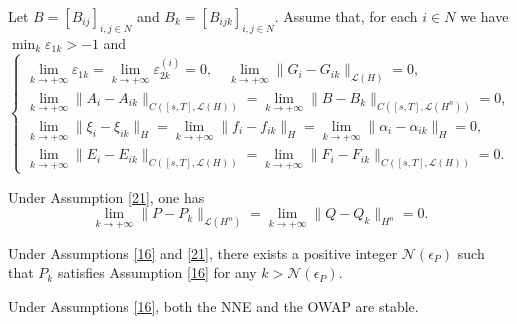 \documentclass[10pt,a4paper]{amsart}
\begin{document}
\begin{assumption}\label{21}
Let $B=[B_{ij}]_{i,j\in N}$ and $B_k=[B_{ijk}]_{i,j\in N}$. Assume that, for each $i\in N$ we have $\min_{k}\varepsilon_{1k}>-1$ and
\begin{equation*}
  \begin{cases}
  \lim_{k\rightarrow+\infty}\varepsilon_{1k}=\lim_{k\rightarrow+\infty}\varepsilon_{2k}^{(i)}=0,\quad\lim_{k\rightarrow+\infty}\|G_i-G_{ik}\|_{\mathcal{L}(H)}=0,\\
    \lim_{k\rightarrow+\infty}\|A_i-A_{ik}\|_{ C([s,T],\mathcal{L}(H))}=\lim_{k\rightarrow+\infty}\|B-B_{k}\|_{ C([s,T],\mathcal{L}(H^n))}=0, \\
  \lim_{k\rightarrow+\infty}\|\xi_i-\xi_{ik}\|_H=\lim_{k\rightarrow+\infty}\|f_i-f_{ik}\|_{H}=\lim_{k\rightarrow+\infty}\|\alpha_i-\alpha_{ik}\|_{H}=0, \\
  \lim_{k\rightarrow+\infty}\|E_i-E_{ik}\|_{ C([s,T],\mathcal{L}(H))}=\lim_{k\rightarrow+\infty}\|F_i-F_{ik}\|_{ C([s,T],\mathcal{L}(H))}=0.
  \end{cases}
\end{equation*}
\end{assumption}

\begin{lemma}\label{33}
Under Assumption \ref{21}, one has $$\lim_{k\rightarrow+\infty}\|P-P_k\|_{\mathcal{L}(H^n)}=\lim_{k\rightarrow+\infty}\|Q-Q_k\|_{H^n}=0.$$
\end{lemma}

\begin{cor}\label{37}
Under Assumptions \ref{16} and \ref{21},  there exists a positive integer  $\mathcal{N}(\epsilon_P)$ such that $P_k$ satisfies  Assumption \ref{16} for any $k>\mathcal{N}(\epsilon_P)$.
\end{cor}

\begin{thm}\label{47}
Under Assumptions \ref{16},  both the NNE  and the OWAP are stable.
\end{thm}
\end{document}
